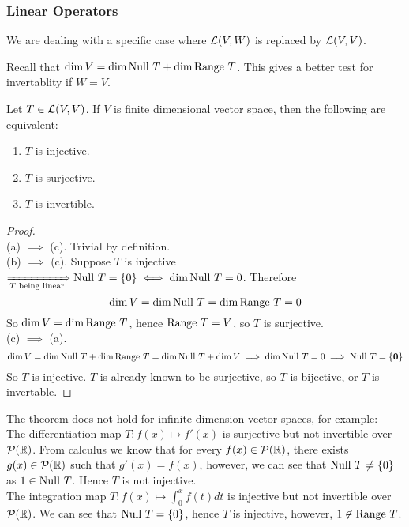 \subsubsection*{Linear Operators}
We are dealing with a specific case where $\mathcal L(V,W)$ is replaced by $\mathcal L(V,V)$.
\begin{center}
\end{center}
Recall that $\dim V = \dim \text{Null } T + \dim \text{Range } T$. This gives a better test for invertablity if $W  = V$. 
\begin{theorem}
    Let $T \in \mathcal L(V,V)$. If $V$ is finite dimensional vector space, then the following are equivalent: 
    \begin{enumerate}[label = (\alph*)]
        \item $T$ is injective.
        \item $T$ is surjective.
        \item $T$ is invertible.
    \end{enumerate}
\end{theorem}
\begin{proof} $ $ \\
    (a) $\implies$ (c). Trivial by definition. \\
    (b) $\implies$ (c). Suppose $T$ is injective $\xRightarrow[T \text{ being linear}]{} \text{Null } T = \left\{ 0 \right\} \iff \dim \text{Null } T = 0$. Therefore 
    \[ \dim V = \dim \text{Null } T = \dim \text{Range } T = 0\] So $\dim V = \dim \text{Range } T$, hence $\text{Range } T = V$, so $T$ is surjective. \\
    (c) $\implies$ (a).  \[\dim V = \dim \text{Null } T + \dim \text{Range } T = \dim \text{Null } T + \dim V \implies \dim \text{Null } T  = 0 \implies \text{Null } T = \left\{ \mathbf 0 \right\}\] So $T$ is injective. $T$ is already known to be surjective, so $T$ is bijective, or $T$ is invertable.
\end{proof}
\begin{example}
    The theorem does not hold for infinite dimension vector spaces, for example: \\ 
    The differentiation map $T : f(x) \mapsto f'(x)$ is surjective but not invertible over $\mathcal P(\mathbb R)$.  From calculus we know that for every $f(x) \in \mathcal P(\mathbb R)$, there exists $g(x) \in \mathcal P(\mathbb R)$ such that $g'(x) = f(x)$, however, we can see that $\text{Null } T \neq \left\{ 0 \right\}$ as $1 \in
    \text{Null } T$. Hence $T$ is not injective. \\
    The integration map $\displaystyle T: f(x) \mapsto \int_0^x f(t) dt$ is injective but not invertible over $\mathcal P(\mathbb R)$. We can see that $\text{Null } T = \left\{ 0 \right\}$, hence $T$ is injective, however, $1 \not\in \text{Range } T$.
\end{example}
